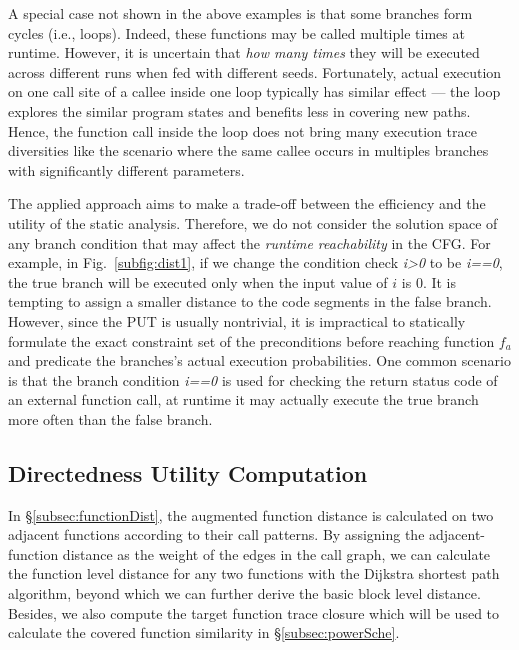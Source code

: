 A special case not shown in the above examples is that some branches form cycles (i.e., loops). Indeed, these functions may be called multiple times at runtime. However, it is uncertain that \emph{how many times} they will be executed across different runs when fed with different seeds. Fortunately, actual execution on one call site of a callee inside one loop typically has similar effect --- the loop explores the similar program states and benefits less in covering new paths. Hence, the function call inside the loop does not bring many execution trace diversities like the scenario where the same callee occurs in multiples branches with significantly different parameters.

The applied approach aims to make a trade-off between the efficiency and the utility of the static analysis. Therefore, we do not consider the solution space of any branch condition that may affect the \emph{runtime reachability} in the CFG. For example, in Fig.~\ref{subfig:dist1}, if we change the condition check \emph{i>0} to be \emph{i==0}, the true branch will be executed only when the input value of $i$ is 0. It is tempting to assign a smaller distance to the code segments in the false branch. However, since the PUT is usually nontrivial, it is impractical to statically formulate the exact constraint set of the preconditions before reaching function $f_a$ and predicate the branches's actual execution probabilities. One common scenario is that the branch condition \emph{i==0} is used for checking the return status code of an external function call, at runtime it may actually execute the true branch more often than the false branch.




\subsection{Directedness Utility Computation} \label{subsec:UtilityComputation}

In \S\ref{subsec:functionDist}, the augmented function distance is calculated on two adjacent functions according to their call patterns. By assigning  the adjacent-function distance as the weight of the edges in the call graph, we can calculate the function level distance for any two functions with the Dijkstra shortest path algorithm, beyond which we can further derive the 
basic block level distance. 
Besides, we also compute the target function trace closure which will be used to calculate the covered function similarity in \S\ref{subsec:powerSche}.

